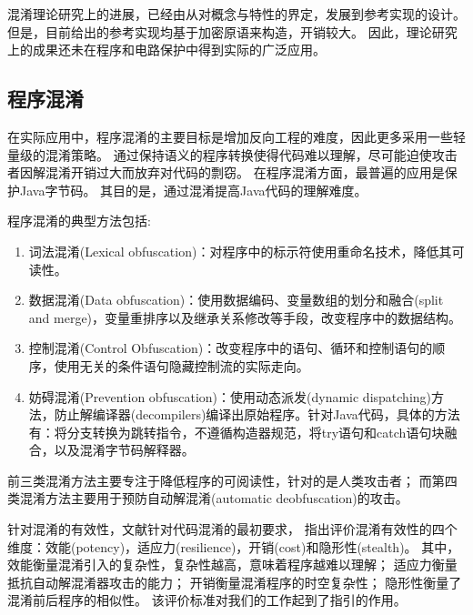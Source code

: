 混淆理论研究上的进展，已经由从对概念与特性的界定，发展到参考实现的设计。
但是，目前给出的参考实现均基于加密原语来构造，开销较大。
因此，理论研究上的成果还未在程序和电路保护中得到实际的广泛应用。

\subsection{程序混淆}
在实际应用中，程序混淆的主要目标是增加反向工程的难度，因此更多采用一些轻量级的混淆策略。
通过保持语义的程序转换使得代码难以理解，尽可能迫使攻击者因解混淆开销过大而放弃对代码的剽窃。
在程序混淆方面，最普遍的应用是保护Java字节码。
其目的是，通过混淆提高Java代码的理解难度。

程序混淆的典型方法包括:
\begin{enumerate}
\item 词法混淆(Lexical obfuscation)：对程序中的标示符使用重命名技术，降低其可读性。
\item 数据混淆(Data obfuscation)：使用数据编码、变量数组的划分和融合(split and merge)，变量重排序以及继承关系修改等手段，改变程序中的数据结构。
\item 控制混淆(Control Obfuscation)：改变程序中的语句、循环和控制语句的顺序，使用无关的条件语句隐藏控制流的实际走向。
\item 妨碍混淆(Prevention obfuscation)：使用动态派发(dynamic dispatching)方法，防止解编译器(decompilers)编译出原始程序。针对Java代码，具体的方法有：将分支转换为跳转指令，不遵循构造器规范，将try语句和catch语句块融合，以及混淆字节码解释器。
\end{enumerate}


前三类混淆方法主要专注于降低程序的可阅读性，针对的是人类攻击者；
而第四类混淆方法主要用于预防自动解混淆(automatic deobfuscation)的攻击。

针对混淆的有效性，文献针对代码混淆的最初要求，
指出评价混淆有效性的四个维度：效能(potency)，适应力(resilience)，开销(cost)和隐形性(stealth)。
其中，效能衡量混淆引入的复杂性，复杂性越高，意味着程序越难以理解；
适应力衡量抵抗自动解混淆器攻击的能力；
开销衡量混淆程序的时空复杂性；
隐形性衡量了混淆前后程序的相似性。
该评价标准对我们的工作起到了指引的作用。

